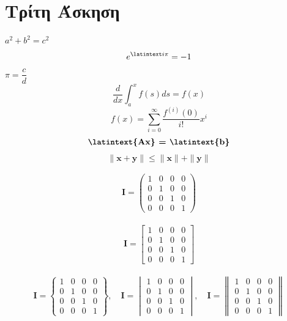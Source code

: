 \documentclass[a4paper,11pt]{article}
\begin{document}
	\section{Τρίτη Άσκηση}
	\begin{center}
		$a^2 + b^2 = c^2$
		$$e^{\latintext i \pi} = -1$$
		$\pi = \dfrac{c}{d}$
		$$\frac{d}{dx}\int_{a}^{x}f(s)ds = f(x)$$
		$$f(x) = \sum_{i=0}^{\infty}\frac{f^{(i)}(0)}{i!}x^i$$
		$$\textbf{\latintext{Ax} = \latintext{b}}$$
		$$\|\mathbf{x}+\mathbf{y}\|\leq\|\mathbf{x}\|+\|\mathbf{y}\|$$
		
		
		\begin{align}
			\mathbf{I} = \begin{pmatrix}
				1 & 0 & 0 & 0 \\
				0 & 1 & 0 & 0 \\
				0 & 0 & 1 & 0 \\
				0 & 0 & 0 & 1
			\end{pmatrix}
		\end{align}
		
		
		\begin{align}
			\mathbf{I} = \begin{bmatrix}
				1 & 0 & 0 & 0 \\
				0 & 1 & 0 & 0 \\
				0 & 0 & 1 & 0 \\
				0 & 0 & 0 & 1
			\end{bmatrix}
		\end{align}
		
		
		
		\begin{align}
			\mathbf{I} = \begin{Bmatrix}
				1 & 0 & 0 & 0 \\
				0 & 1 & 0 & 0 \\
				0 & 0 & 1 & 0 \\
				0 & 0 & 0 & 1
			\end{Bmatrix}
			,\quad 
			\mathbf{I} = \begin{vmatrix}
				1 & 0 & 0 & 0 \\
				0 & 1 & 0 & 0 \\
				0 & 0 & 1 & 0 \\
				0 & 0 & 0 & 1
			\end{vmatrix}
			,\quad 
			\mathbf{I} = \begin{Vmatrix}
				1 & 0 & 0 & 0 \\
				0 & 1 & 0 & 0 \\
				0 & 0 & 1 & 0 \\
				0 & 0 & 0 & 1
			\end{Vmatrix}
		\end{align}
		
	\end{center}
	
\end{document}
